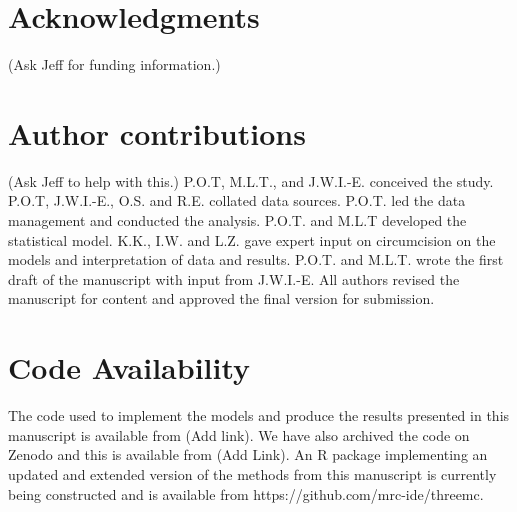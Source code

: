 \documentclass{article}
\begin{document}



\section*{Acknowledgments}


{\color{red}(Ask Jeff for funding information.)}


\section*{Author contributions}


{\color{red}(Ask Jeff to help with this.)} P.O.T, M.L.T., and J.W.I.-E. conceived the study. P.O.T, J.W.I.-E., O.S. and R.E. collated data sources. P.O.T. led the data management and conducted the analysis. P.O.T. and M.L.T developed the statistical model. K.K., I.W. and L.Z. gave expert input on circumcision on the models and interpretation of data and results. P.O.T. and M.L.T. wrote the first draft of the manuscript with input from J.W.I.-E. All authors revised the manuscript for content and approved the final version for submission.


\section*{Code Availability}


The code used to implement the models and produce the results presented in this manuscript is available from {\color{red}(Add link)}. We have also archived the code on Zenodo and this is available from {\color{red}(Add Link)}. An R package implementing an updated and extended version of the methods from this manuscript is currently being constructed and is available from https://github.com/mrc-ide/threemc.
\end{document}
